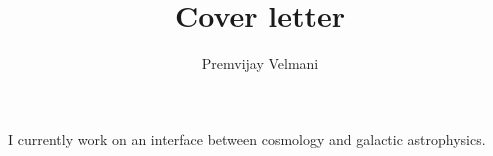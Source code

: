 \documentclass{article}
\title{Cover letter}
\author{Premvijay Velmani}
\begin{document}
\maketitle
I currently work on an interface between cosmology and galactic astrophysics.
\end{document}
